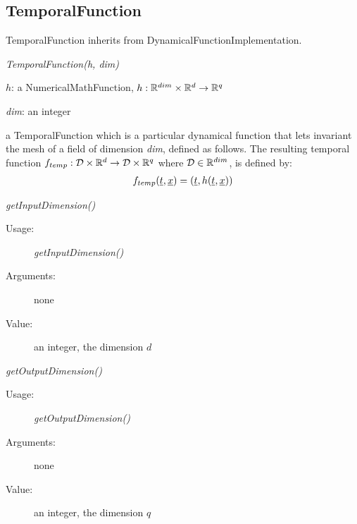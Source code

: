 \subsection{TemporalFunction}

TemporalFunction inherits from DynamicalFunctionImplementation.

\begin{description}

\item[Usage:]   \textit{TemporalFunction(h, dim)}

\item[Arguments:]
\begin{description}
\item$h$: a NumericalMathFunction, $h :  {\mathbb R}^{dim} \times {\mathbb R}^d  \rightarrow {\mathbb R}^q$
\item \textit{dim}: an integer
\end{description}


\item[Value:] a TemporalFunction which is a particular dynamical function that lets invariant the mesh of a field  of dimension \textit{dim}, defined as follows.  The resulting  temporal function $f_{temp}: {\mathcal D} \times {\mathbb R}^d \rightarrow {\mathcal D} \times {\mathbb R}^q$  where ${\mathcal D} \in {\mathbb R}^{dim}$, is defined by:
\begin{align}\label{tempFunc}
f_{temp}({\underline{t}}, {\underline{x}})=({\underline{t}}, h({\underline{t}},{\underline{x}}))
\end{align}


\item[Some methods:]  \rule{0pt}{1em}
\begin{description}


\item \textit{getInputDimension()}
\begin{description}
\item[Usage:] \textit{getInputDimension()}
\item[Arguments:] none
\item[Value:] an integer, the dimension $d$
\end{description}
\bigskip

\item \textit{getOutputDimension()}
\begin{description}
\item[Usage:] \textit{getOutputDimension()}
\item[Arguments:] none
\item[Value:] an integer, the dimension $q$
\end{description}
\bigskip


\end{description}
\end{description}

